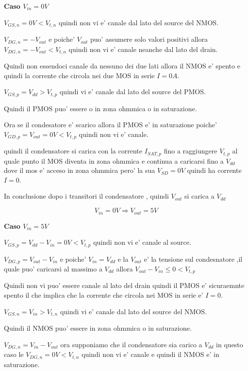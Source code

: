 \documentclass[\main/main.tex]{subfiles}
\begin{document}
\textbf{Caso $V_{in} = 0V$}

$V_{GS,n} = 0V < V_{t,n}$ quindi non vi e' canale dal lato del source del NMOS.

$V_{DG,n} = -V_{out} $ e poiche' $V_{out}$ puo' assumere solo valori positivi allora $V_{DG,n} = -V_{out} < V_{t,n}$ quindi non vi e' canale neanche dal lato del drain.

Quindi non essendoci canale da nessuno dei due lati allora il NMOS e' spento e quindi la corrente che circola nei due MOS in serie $I = 0A$.


$V_{GS,p} = V_{dd} > V_{t,p}$ quindi vi e' canale dal lato del source del PMOS.

Quindi il PMOS puo' essere o in zona ohmmica o in saturazione.

Ora se il condesatore e' scarico allora il PMOS e' in saturazione poiche' $V_{GD,p} = V_{out} = 0V < V_{t,p}$ quindi non vi e' canale.

quindi il condensatore si carica con la corrente $I_{SAT,p}$ fino a raggiungere $V_{t,p}$ al quale punto il MOS diventa in zona ohmmica
e continua a caricarsi fino a $V_{dd}$ dove il mos e' acceso in zona ohmmica pero' la sua $V_{SD} = 0V$ quindi ha corrente $I = 0$.

In conclusione dopo i transitori il condensatore , quindi $V_{out}$ si carica a $V_{dd}$

\[V_{in} = 0V \Rightarrow V_{out} = 5V\]



\textbf{Caso $V_{in} = 5V$}

$V_{GS,p} = V_{dd} - V_{in} = 0V < V_{t,p}$ quindi non vi e' canale al source.

$V_{DG,p} = V_{out} - V_{in}$ e poiche' $V_{in} = V_{dd}$ e la $V_{out}$ e' la tensione sul condesnatore ,il quale puo' caricarsi al massimo a $V_{dd}$ allora $V_{out} - V_{in} \le 0 < V_{t,p}$

Quindi non vi puo' essere canale al lato del drain  quindi il PMOS e' sicuraemnte spento il che implica che la corrente che circola nei MOS in serie e' $I = 0$.

$V_{GS,n} = V_{in} > V_{t,n}$ quindi vi e' canale dal lato del source del NMOS.

Quindi il NMOS puo' essere in zona ohmmica o in saturazione.

$V_{DG,n} = V_{in} - V_{out}$ ora supponiamo che il condensatore sia carico a $V_{dd}$ in questo caso le $V_{DG,n} = 0V < V_{t,n}$ quindi non vi e' canale e quindi il NMOS e' in saturazione.
\end{document}
